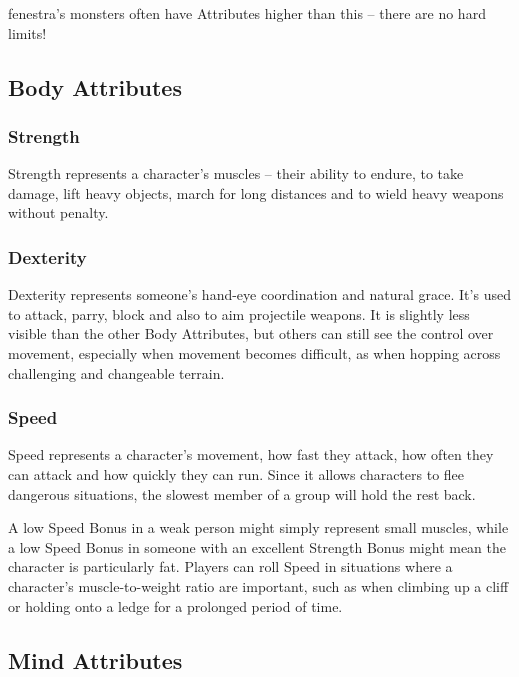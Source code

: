 \begin{multicols}{2}
\Gls{fenestra}'s \glspl{monster} often have Attributes higher than this -- there are no hard limits!

\subsection{Body Attributes}


\subsubsection[Strength]{Strength }

Strength represents a character's muscles -- their ability to endure, to take damage, lift heavy objects, march for long distances and to wield heavy weapons without penalty.

\subsubsection[Dexterity]{Dexterity }

Dexterity represents someone's hand-eye coordination and natural grace.
It's used to attack, parry, block and also to aim projectile weapons.
It is slightly less visible than the other Body Attributes, but others can still see the control over movement, especially when movement becomes difficult, as when hopping across challenging and changeable terrain.

\subsubsection[Speed]{Speed }

Speed represents a character's movement, how fast they attack, how often they can attack and how quickly they can run.
Since it allows characters to flee dangerous situations, the slowest member of a group will hold the rest back.

A low Speed Bonus in a weak person might simply represent small muscles, while a low Speed Bonus in someone with an excellent Strength Bonus might mean the character is particularly fat.
Players can roll Speed in situations where a character's muscle-to-weight ratio are important, such as when climbing up a cliff or holding onto a ledge for a prolonged period of time.

\subsection{Mind Attributes}


\end{multicols}
